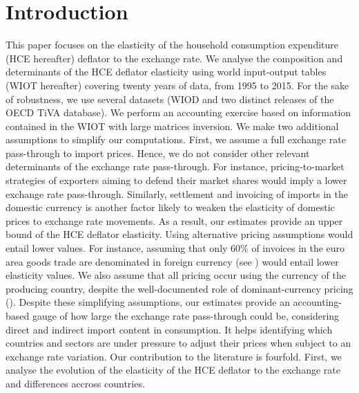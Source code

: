 \documentclass[12pt,a4paper]{paper}
\begin{document}
\section*{Introduction}
This paper focuses on the elasticity of the household consumption expenditure (HCE hereafter) deflator to the exchange rate. 
We analyse the composition and determinants of the HCE deflator elasticity using world input-output tables (WIOT hereafter) covering twenty years of data, from 1995 to 2015.
For the sake of robustness, we use several datasets (WIOD and two distinct releases of the OECD TiVA database). 
We perform an accounting exercise based on information contained in the WIOT with large matrices inversion. 
We make two additional assumptions to simplify our computations. 
First, we assume a full exchange rate pass-through to import prices. 
Hence, we do not consider other relevant determinants of the exchange rate pass-through.
For instance, pricing-to-market strategies of exporters aiming to defend their market shares would imply a lower exchange rate pass-through.
Similarly, settlement and invoicing of imports in the domestic currency is another factor likely to weaken the elasticity of domestic prices to exchange rate movements.
As a result, our estimates provide an upper bound of the HCE deflator elasticity.
Using alternative pricing assumptions would entail lower values.
For instance, assuming that only 60\% of invoices in the euro area goods trade are denominated in foreign currency (see \cite{Ortega2020}) would entail lower elasticity values. 
We also assume that all pricing occur using the currency of the producing country, despite the well-documented role of dominant-currency pricing (\cite{Gopinath2020}).
Despite these simplifying assumptions, our estimates provide an accounting-based gauge of how large the exchange rate pass-through could be, considering direct and indirect import content in consumption. 
It helps identifying which countries and sectors are under pressure to adjust their prices when subject to an exchange rate variation. 
Our contribution to the literature is fourfold. 
First, we analyse the evolution of the elasticity of the HCE deflator to the exchange rate and differences accross countries.
\end{document}
